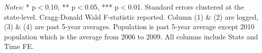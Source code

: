 \begin{table}[htbp] \centering
\caption{Effects on Business Dynamics with Population Change}
\label{tab:pop} \newsavebox{\boxpop} \newlength{\tablepop}
\settowidth{\tablepop}{\usebox{\boxpop}}
\usebox{\boxpop} \vspace{0.5em} 
\parbox{\tablepop}{\footnotesize \textit{Notes:} * p$<$0.10, ** p$<$0.05, *** p$<$0.01. Standard errors clustered at the state-level. Cragg-Donald Wald F-statistic reported. Column (1) \& (2) are logged, (3) \& (4) are past 5-year averages. Population is past 5-year average except 2010 population which is the average from 2006 to 2009. All columns include State and Time FE.}
 \end{table}
